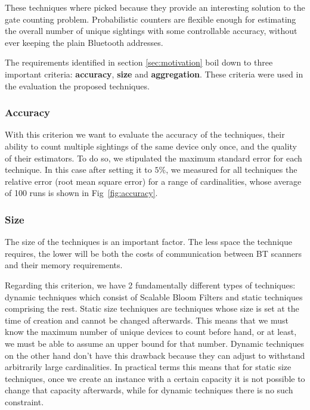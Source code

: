 These techniques where picked because they provide an interesting
solution to the gate counting problem. Probabilistic counters are
flexible enough for estimating the overall number of unique sightings
with some controllable accuracy, without ever keeping the plain
Bluetooth addresses.

The requirements identified in section \ref{sec:motivation} boil down
to three important criteria: \textbf{accuracy}, \textbf{size} and
\textbf{aggregation}. These criteria were used in the evaluation the
proposed techniques.



\subsubsection{Accuracy}
\label{sec:accuracy}

With this criterion we want to evaluate the accuracy of the
techniques, their ability to count multiple sightings of the same
device only once, and the quality of their estimators. To do so, we
stipulated the maximum standard error for each technique. In this case
after setting it to  $5\%$, we measured for all %
techniques the relative error (root mean square error) for a range of
cardinalities, whose average of 100 runs is shown in
Fig~\ref{fig:accuracy}.

\subsubsection{Size}
\label{sec:size}
The size of the techniques is an important factor. The less space the
technique requires, the lower will be both the costs of communication
between BT scanners and their memory requirements.

Regarding this criterion, we have 2 fundamentally different
types of techniques: dynamic techniques which consist of Scalable Bloom
Filters and static techniques comprising the rest. Static
size techniques are techniques whose size is set at the time of creation and
cannot be changed afterwards. This means that we must know the maximum
number of unique devices to count before hand, or at least, we must be able
to assume an upper bound for that number. Dynamic techniques on the other
hand don't have this drawback because they can adjust to withstand
arbitrarily large cardinalities. In practical terms this means that for
static size techniques, once we create an instance with a certain capacity
it is not possible to change that capacity afterwards, while for dynamic
techniques there is no such constraint.

